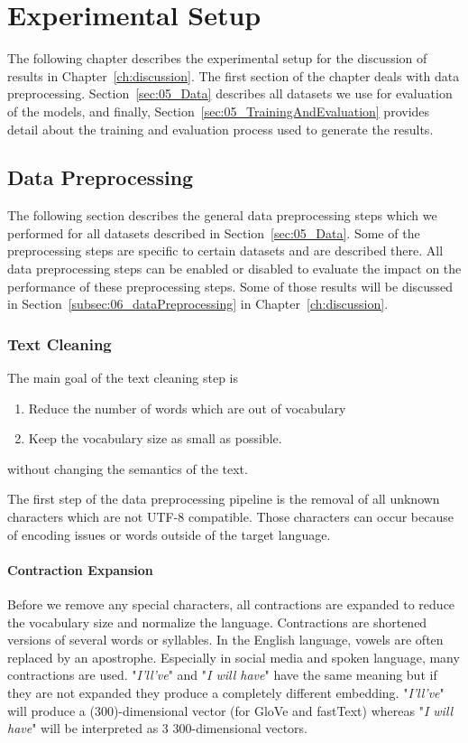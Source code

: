\chapter{Experimental Setup}
\label{ch:setup}

The following chapter describes the experimental setup for the discussion of results in Chapter~\ref{ch:discussion}. The first section of the chapter deals with data preprocessing. Section~\ref{sec:05_Data} describes all datasets we use for evaluation of the models, and finally, Section~\ref{sec:05_TrainingAndEvaluation} provides detail about the training and evaluation process used to generate the results.

\section{Data Preprocessing}
The following section describes the general data preprocessing steps which we performed for all datasets described in Section~\ref{sec:05_Data}. Some of the preprocessing steps are specific to certain datasets and are described there. All data preprocessing steps can be enabled or disabled to evaluate the impact on the performance of these preprocessing steps. Some of those results will be discussed in Section~\ref{subsec:06_dataPreprocessing} in Chapter~\ref{ch:discussion}.

\subsection{Text Cleaning}
The main goal of the text cleaning step is 
\begin{enumerate}
    \item Reduce the number of words which are out of vocabulary
    \item Keep the vocabulary size as small as possible.
\end{enumerate}

without changing the semantics of the text.
\medskip

The first step of the data preprocessing pipeline is the removal of all unknown characters which are not UTF-8 compatible. Those characters can occur because of encoding issues or words outside of the target language. 
\subsubsection*{Contraction Expansion}

Before we remove any special characters, all contractions are expanded to reduce the vocabulary size and normalize the language. Contractions are shortened versions of several words or syllables. In the English language, vowels are often replaced by an apostrophe.  Especially in social media and spoken language, many contractions are used. "\textit{I'll've}" and "\textit{I will have}" have the same meaning but if they are not expanded they produce a completely different embedding. "\textit{I'll've}" will produce a (300)-dimensional vector (for GloVe and fastText) whereas "\textit{I will have}" will be interpreted as 3 300-dimensional vectors.
\medskip

